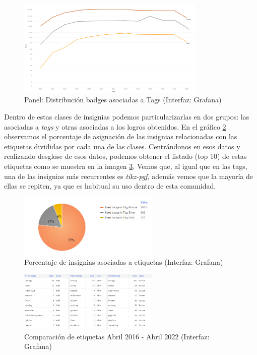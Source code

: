 \documentclass[a4paper, 12pt]{book}
\begin{document}
\begin{figure}[ht]
    \centering
    \includegraphics[width=0.8\textwidth]{img/tex/badges_tex.png}
    \caption{Panel: Distribución badges asociadas a Tags (Interfaz: Grafana)}
    \label{figura:badges_tex}
\end{figure}


Dentro de estas clases de insignias podemos particularizarlas en dos grupos: las asociadas a \emph{tags} y otras asociadas a los logros obtenidos. En el gráfico \ref{figura:badges_tag_tex_dist} observamos el porcentaje de asignación de las insignias relacionadas con las etiquetas divididas por cada una de las clases. Centrándonos en esos datos y realizando desglose de esos datos, podemos obtener el listado (top 10) de estas etiquetas como se muestra en la imagen \ref{figura:badges_tags_data_tex}. Vemos que, al igual que en las tags, una de las insignias más recurrentes es \emph{tikz-pgf}, además vemos que la mayoría de ellas se repiten, ya que es habitual su uso dentro de esta comunidad.

\begin{figure}[ht]
    \centering
    \includegraphics[width=0.6\textwidth]{img/tex/Badges_tag_tex_dist.png}
    \caption{Porcentaje de insignias asociadas a etiquetas (Interfaz: Grafana)}
    \label{figura:badges_tag_tex_dist}
\end{figure}

\begin{figure}[ht]
    \centering
    \includegraphics[width=0.6\textwidth]{img/tex/Badges_tag_tex_data.png}
    \caption{Comparación de etiquetas Abril 2016 - Abril 2022 (Interfaz: Grafana)}
    \label{figura:badges_tags_data_tex}
\end{figure}
\end{document}
